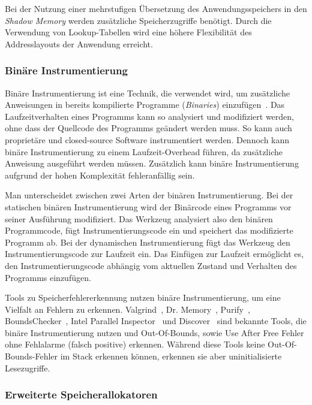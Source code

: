 \documentclass[acmtog,nonacm]{acmart}
\begin{document}
Bei der Nutzung einer mehrstufigen Übersetzung des Anwendungsspeichers in den
\textit{Shadow Memory} werden zusätzliche Speicherzugriffe benötigt. Durch die
Verwendung von Lookup-Tabellen wird eine höhere Flexibilität des
Addresslayouts der Anwendung erreicht.

\subsubsection{Binäre Instrumentierung}\label{sec:binary-instrumentation}

Binäre Instrumentierung ist eine Technik, die verwendet wird, um zusätzliche
Anweisungen in bereits kompilierte Programme (\textit{Binaries})
einzufügen~\cite{nethercore_dynamic_2004}. Das Laufzeitverhalten eines
Programms kann so analysiert und modifiziert werden, ohne dass der Quellcode
des Programms geändert werden muss. So kann auch proprietäre und closed-source
Software instrumentiert werden. Dennoch kann binäre Instrumentierung zu einem
Laufzeit-Overhead führen, da zusätzliche Anweisung ausgeführt werden müssen.
Zusätzlich kann binäre Instrumentierung aufgrund der hohen Komplexität
fehleranfällig sein.

Man unterscheidet zwischen zwei Arten der binären Instrumentierung. Bei der
statischen binären Instrumentierung wird der Binärcode eines Programms vor
seiner Ausführung modifiziert. Das Werkzeug analysiert also den binären
Programmcode, fügt Instrumentierungscode ein und speichert das modifizierte
Programm ab. Bei der dynamischen Instrumentierung fügt das Werkzeug den
Instrumentierungscode zur Laufzeit ein. Das Einfügen zur Laufzeit ermöglicht
es, den Instrumentierungscode abhängig vom aktuellen Zustand und Verhalten des
Programms einzufügen.

Tools zu Speicherfehlererkennung nutzen binäre Instrumentierung, um eine
Vielfalt an Fehlern zu erkennen. Valgrind~\cite{valgrind_2007},
Dr. Memory~\cite{dr-memory_20011}, Purify~\cite{purify_1991},
BoundsChecker~\cite{bounds-checker_2024},
Intel Parallel Inspector~\cite{intel-inspector_2024} und
Discover~\cite{oracle-discover_2024} sind bekannte Tools, die binäre
Instrumentierung nutzen und Out-Of-Bounds, sowie Use After Free Fehler ohne
Fehlalarme (falsch positive) erkennen. Während diese Tools keine
Out-Of-Bounds-Fehler im Stack erkennen können, erkennen sie aber
uninitialisierte Lesezugriffe.

\subsubsection{Erweiterte Speicherallokatoren}\label{sec:debug-allocators}
\end{document}
